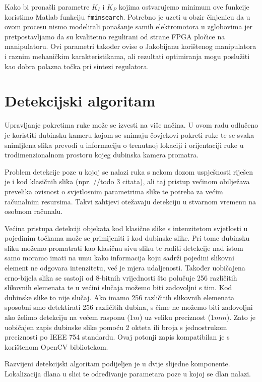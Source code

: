 \documentclass[times, utf8, diplomski, numeric]{fer}
\begin{document}
Kako bi pronašli parametre $K_I$ i $K_P$ kojima ostvarujemo minimum ove funkcije koristimo Matlab funkciju \verb|fminsearch|.
Potrebno je uzeti u obzir činjenicu da u ovom procesu nismo modelirali ponašanje samih elektromotora u zglobovima jer pretpostavljamo da su kvalitetno regulirani od strane FPGA pločice na manipulatoru. 
Ovi parametri također ovise o Jakobijanu korištenog manipulatora i raznim mehaničkim karakteristikama, ali rezultati optimiranja mogu poslužiti kao dobra polazna točka pri sintezi regulatora.

\chapter{Detekcijski algoritam}\label{Detekcijski algoritam}
Upravljanje pokretima ruke može se izvesti na više načina. U ovom radu odlučeno je koristiti dubinsku kameru kojom se snimaju čovjekovi pokreti ruke te se svaka snimljlena slika prevodi u informaciju o trenutnoj lokaciji i orijentaciji ruke u trodimenzionalnom prostoru kojeg dubinska kamera promatra.

Problem detekcije poze u kojoj se nalazi ruka s nekom dozom uspješnosti riješen je i kod klasičnih slika (npr. //todo 3 citata), ali taj pristup većinom obilježava prevelika
ovisnost o svjetlosnim parametrima slike te potreba za većim računalnim resursima. Takvi zahtjevi otežavaju detekciju u stvarnom vremenu na osobnom računalu.

Većina pristupa detekciji objekata kod klasične slike s intenzitetom svjetlosti u pojedinim točkama može se primijeniti i kod dubinske slike. Pri tome dubinsku sliku možemo promatrati kao klasičnu sivu sliku te raditi detekcije nad istom samo moramo imati na umu kako informacija koju sadrži pojedini slikovni element ne odgovara intenzitetu, već je mjera udaljenosti. Također uobičajena crno-bijela slika se sastoji od 8-bitnih vrijednosti što polučuje 256 različitih slikovnih elemenata te u većini slučaja možemo biti zadovoljni s tim. Kod dubinske slike to nije slučaj. Ako imamo 256 različitih slikovnih elemenata sposobni smo detektirati 256 različitih dubina, s čime ne možemo biti zadovoljni ako želimo detekciju na većem rasponu ($1m$) uz veliku preciznost ($1mm$). Zato je uobičajen zapis dubinske slike
pomoću 2 okteta ili broja s jednostrukom preciznosti po IEEE 754 standardu. Ovaj
potonji zapis kompatibilan je s korištenom OpenCV bibliotekom.

Razvijeni detekcijski algoritam podijeljen je u dvije slijedne komponente. Lokalizacija dlana  u slici te određivanje parametara poze u kojoj se dlan nalazi.
\end{document}
